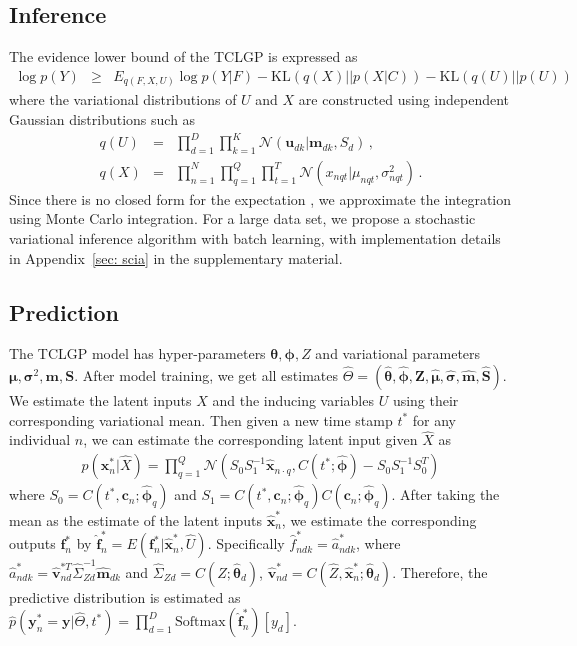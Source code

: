 \documentclass{article}
\begin{document}
\subsection{Inference}
The evidence lower bound of the TCLGP is expressed as
\begin{eqnarray}
\log p(Y) & \geq & E_{q(F,X,U)}\log p(Y|F) - \mathrm{KL}(q(X)||p(X|C)) - \mathrm{KL}(q(U)||p(U)) \nonumber 
\end{eqnarray}
where the variational distributions of $U$ and $X$ are constructed using independent Gaussian distributions such as 
\begin{eqnarray}
q(U) & = & \prod_{d = 1}^{D}\prod_{k = 1}^{K}\mathcal{N}(\bm u_{dk}| \bm m_{dk}, S_d)\,, \nonumber \\
q(X) & = & \prod_{n = 1}^{N}\prod_{q = 1}^{Q}\prod_{t = 1}^{T} \mathcal{N}(x_{nqt}| \mu_{nqt}, \sigma_{nqt}^2)\,. \nonumber
\end{eqnarray}
Since there is no closed form for the expectation \citep{Gal_2015}, we approximate the integration using Monte Carlo integration. For a large data set, we propose a stochastic variational inference algorithm with batch learning, with implementation details in Appendix~\ref{sec: scia} in the supplementary material.

\subsection{Prediction}
The TCLGP model has hyper-parameters $\bm\theta, \bm\phi, Z$ and variational parameters $\bm \mu, \bm \sigma^2, \bm m, \bm S$. After model training, we get all estimates $\hat{\varTheta} = (\hat{\bm \theta}, \hat{\bm \phi}, \hat{\bm Z}, \hat{\bm \mu}, \hat{\bm \sigma}, \hat{\bm m}, \hat{\bm S})$. We estimate the latent inputs $X$ and the inducing variables $U$ using their corresponding variational mean. Then given a new time stamp $t^*$ for any individual $n$, we can estimate the corresponding latent input given $\hat{X}$ as 
\begin{eqnarray}
p(\bm x_n^*|\hat{X}) = \prod_{q = 1}^{Q}\mathcal{N}(S_0 S_1^{-1}\hat{\bm x}_{n\cdot q}, C(t^*; \hat{\bm \phi}) - S_0 S_1^{-1}S_0^T)
\end{eqnarray}
where $S_0 = C(t^*, \bm c_n; \hat{\bm \phi}_q)$ and $S_1 = C(t^*, \bm c_n; \hat{\bm \phi}_q)C(\bm c_n; \hat{\bm \phi}_q)$. After taking the mean as the estimate of the latent inputs $\hat{\bm x}_n^*$, we estimate the corresponding outputs $\bm f_n^*$ by $\hat{\bm f}_n^* = E(\bm f_n^*|\hat{\bm x}_n^*, \hat{U})$. Specifically $\hat{f}^*_{ndk} = \hat{a}_{ndk}^*$, where  $\hat{a}_{ndk}^* = \hat{\bm v}^{*T}_{nd}\hat{\Sigma}_{Zd}^{-1}\hat{\bm m}_{dk}$ and $\hat{\Sigma}_{Zd} = C(\hat{Z}; \hat{\bm \theta}_d)$, $\hat{\bm v}_{nd}^* = C(\hat{Z}, \hat{\bm x}_n^*; \hat{\bm \theta}_d)$. Therefore, the predictive distribution is estimated as $\hat{p}(\bm y_n^* = \bm y|\hat{\varTheta}, t^*) = \prod_{d = 1}^D \mathrm{Softmax}(\hat{\bm f}_n^*)[y_d]$.
\end{document}
